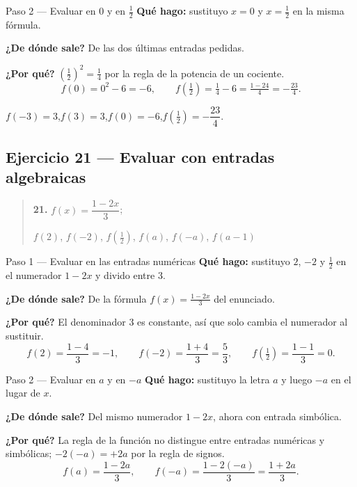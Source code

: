 \documentclass[11pt]{article}
\begin{document}
\begin{paso}{Paso 2 --- Evaluar en $0$ y en $\tfrac12$}
\textbf{Qué hago:} sustituyo $x=0$ y $x=\tfrac12$ en la misma fórmula.

\textbf{¿De dónde sale?} De las dos últimas entradas pedidas.

\textbf{¿Por qué?} $\left(\tfrac12\right)^2=\tfrac14$ por la regla de la potencia de un cociente.
\[
f(0)=0^2-6=-6,\qquad f\!\left(\tfrac12\right)=\tfrac14-6=\tfrac{1-24}{4}=-\tfrac{23}{4}.
\]
\end{paso}

\begin{resp}
$f(-3)=3$,\quad $f(3)=3$,\quad $f(0)=-6$,\quad $f\!\left(\tfrac12\right)=-\dfrac{23}{4}$.
\end{resp}

\subsection*{Ejercicio 21 — Evaluar con entradas algebraicas}

\begin{quote}
\textbf{21.} $f(x)=\dfrac{1-2x}{3}$;

\qquad $f(2)$, $f(-2)$, $f\!\left(\tfrac12\right)$, $f(a)$, $f(-a)$, $f(a-1)$
\end{quote}

\begin{paso}{Paso 1 --- Evaluar en las entradas numéricas}
\textbf{Qué hago:} sustituyo $2$, $-2$ y $\tfrac12$ en el numerador $1-2x$ y divido entre 3.

\textbf{¿De dónde sale?} De la fórmula $f(x)=\frac{1-2x}{3}$ del enunciado.

\textbf{¿Por qué?} El denominador $3$ es constante, así que solo cambia el numerador al sustituir.
\[
f(2)=\frac{1-4}{3}=-1,\qquad f(-2)=\frac{1+4}{3}=\frac53,\qquad f\!\left(\tfrac12\right)=\frac{1-1}{3}=0.
\]
\end{paso}

\begin{paso}{Paso 2 --- Evaluar en $a$ y en $-a$}
\textbf{Qué hago:} sustituyo la letra $a$ y luego $-a$ en el lugar de $x$.

\textbf{¿De dónde sale?} Del mismo numerador $1-2x$, ahora con entrada simbólica.

\textbf{¿Por qué?} La regla de la función no distingue entre entradas numéricas y simbólicas; $-2(-a)=+2a$ por la regla de signos.
\[
f(a)=\frac{1-2a}{3},\qquad f(-a)=\frac{1-2(-a)}{3}=\frac{1+2a}{3}.
\]
\end{paso}
\end{document}
